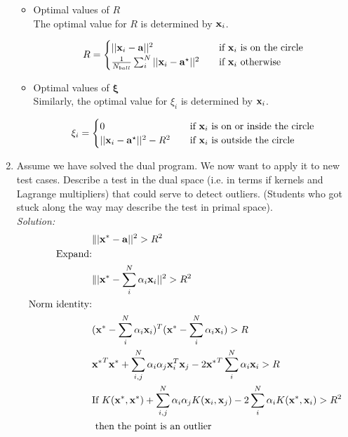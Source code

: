 \documentclass[12pt,a4paper]{article}
\newcommand{\xscalar}{x}
\newcommand{\xvec}{{\bf \xscalar}}
\newcommand{\avec}{\mathbf{a}}
\begin{document}
\begin{enumerate}
\begin{itemize}
			\item Optimal values of $R$ \\
				The optimal value for $R$ is determined by $\xvec_i$.
				
				\begin{equation*}
				R = \begin{cases}
				||\xvec_i - \avec||^2 & \quad \text{if } \xvec_i \text{ is on the circle}\\
				\frac{1}{N_{ball}}\sum_i^N ||\xvec_i - \avec^\star||^2  & \quad \text{if } \xvec_i \text{ otherwise}\\
				\end{cases}
				\end{equation*}
			
			\item Optimal values of $\boldsymbol{\xi}$ \\
				Similarly, the optimal value for $\xi_i$ is determined by $\xvec_i$.
				
				\begin{equation*}
				\xi_i = \begin{cases}
				0      & \quad \text{if } \xvec_i \text{ is on or inside the circle}\\
				||\xvec_i - \avec^\star||^2 - R^2  & \quad \text{if } \xvec_i \text{ is outside the circle}\\
				\end{cases}
				\end{equation*}
		\end{itemize}


\item Assume we have solved the dual program. We now want to apply it to new test cases. Describe a test in the dual space (i.e. in terms if kernels and Lagrange multipliers) that could serve to detect outliers. (Students who got stuck along the way may describe the test in primal space). \\
\emph{Solution:} \\
\begin{align*}
&\||\xvec^* - \avec||^2 > R^2 \\
\text{Expand:} \\
&\||\xvec^* - \sum_i^N \alpha_i \xvec_i||^2 > R^2 \\
\text{Norm identity:} \\
&(\xvec^* - \sum_i^N \alpha_i \xvec_i)^T(\xvec^* - \sum_i^N \alpha_i \xvec_i) > R \\
&{\xvec^*}^T\xvec^* + \sum_{i,j}^N \alpha_i \alpha_j \xvec_i^T \xvec_j - 2 {\xvec^*}^T \sum_i^N \alpha_i \xvec_i > R \\
&\text{If } K(\xvec^*, \xvec^*) + \sum_{i,j}^N \alpha_i \alpha_j K(\xvec_i, \xvec_j) - 2 \sum_i^N \alpha_i K(\xvec^*, \xvec_i) > R^2 \\
&\text{  then the point is an outlier} \\
\end{align*}


\end{enumerate}
\end{document}
